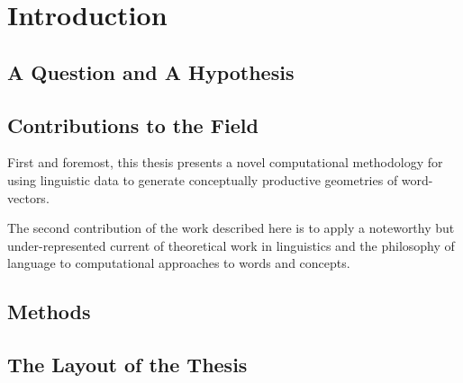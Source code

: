 \chapter{Introduction}

\section{A Question and A Hypothesis}

\section{Contributions to the Field}
First and foremost, this thesis presents a novel computational methodology for using linguistic data to generate conceptually productive geometries of word-vectors.

The second contribution of the work described here is to apply a noteworthy but under-represented current of theoretical work in linguistics and the philosophy of language to computational approaches to words and concepts.

\section{Methods}

\section{The Layout of the Thesis}
